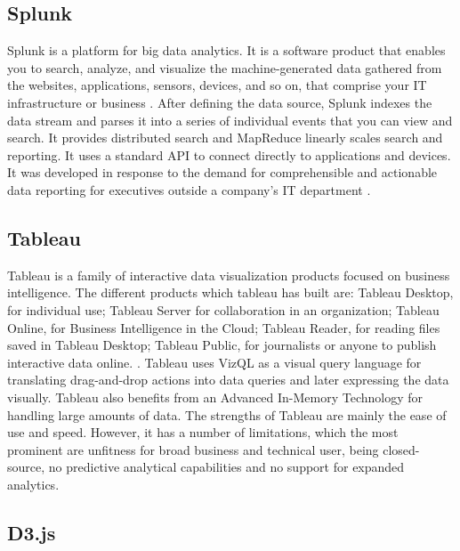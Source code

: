\subsection{Splunk}

    Splunk is a platform for big data analytics. It is a software
    product that enables you to search, analyze, and visualize the
    machine-generated data gathered from the websites, applications,
    sensors, devices, and so on, that comprise your IT infrastructure
    or business \cite{www-splunk}. After defining the data source,
    Splunk indexes the data stream and parses it into a series of
    individual events that you can view and search. It provides
    distributed search and MapReduce linearly scales search and
    reporting. It uses a standard API to connect directly to
    applications and devices. It was developed in response to the
    demand for comprehensible and actionable data reporting for
    executives outside a company's IT department \cite{www-splunk}.
	  
\subsection{Tableau \cv}

    \cite{www-tableau-tutorial} Tableau is a family of interactive
    data visualization products focused on business intelligence. The
    different products which tableau has built are: Tableau Desktop,
    for individual use; Tableau Server for collaboration in an
    organization; Tableau Online, for Business Intelligence in the
    Cloud; Tableau Reader, for reading files saved in Tableau Desktop;
    Tableau Public, for journalists or anyone to publish interactive
    data online. \cite{www-tableau-web}. Tableau uses VizQL as a
    visual query language for translating drag-and-drop actions into
    data queries and later expressing the data visually. Tableau also
    benefits from an Advanced In-Memory Technology for handling large
    amounts of data.  The strengths of Tableau are mainly the ease of
    use and speed.  However, it has a number of limitations, which the
    most prominent are unfitness for broad business and technical
    user, being closed-source, no predictive analytical capabilities
    and no support for expanded analytics.

\subsection{D3.js}

